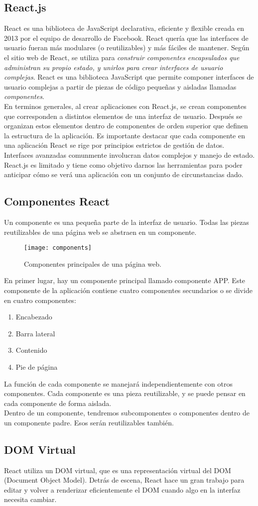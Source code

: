 \subsection{React.js}
React es una biblioteca de JavaScript declarativa, eficiente y flexible creada en 2013 por el equipo de desarrollo de Facebook. React quería que las interfaces de usuario fueran más modulares (o reutilizables) y más fáciles de mantener. Según el sitio web de React, se utiliza para \textit{construir componentes encapsulados que administran su propio estado, y unirlos para crear interfaces de usuario complejas}. React es una biblioteca JavaScript que permite componer interfaces de usuario complejas a partir de piezas de código pequeñas y aisladas llamadas \textit{componentes}.\\[0.8cm]
En terminos generales, al crear aplicaciones con React.js, se crean componentes que corresponden a distintos elementos de una interfaz de usuario. Después se organizan estos elementos dentro de componentes de orden superior que definen la estructura de la aplicación. Es importante destacar que cada componente en una aplicación React se rige por principios estrictos de gestión de datos. Interfaces avanzadas comunmente involucran datos complejos y manejo de estado. React.js es limitado y tiene como objetivo darnos las herramientas para poder anticipar cómo se verá una aplicación con un conjunto de circunstancias dado.
\subsection{Componentes React}
Un componente es una pequeña parte de la interfaz de usuario. Todas las piezas reutilizables de una página web se abstraen en un componente.
\begin{figure}[H]
  \centering
  \texttt{[image: components]}
  \caption{Componentes principales de una página web.}
\end{figure}
En primer lugar, hay un componente principal llamado componente APP. Este componente de la aplicación contiene cuatro componentes secundarios o se divide en cuatro componentes:
\begin{enumerate}
  \item Encabezado
  \item Barra lateral
  \item Contenido
  \item Pie de página
\end{enumerate}
La función de cada componente se manejará independientemente con otros componentes. Cada componente es una pieza reutilizable, y se puede pensar en cada componente de forma aislada. \\[0.8cm]
Dentro de un componente, tendremos subcomponentes o componentes dentro de un componente padre. Esos serán reutilizables también.
\subsection{DOM Virtual}
React utiliza un DOM virtual, que es una representación virtual del DOM (Document Object Model). Detrás de escena, React hace un gran trabajo para editar y volver a renderizar eficientemente el DOM cuando algo en la interfaz necesita cambiar.
